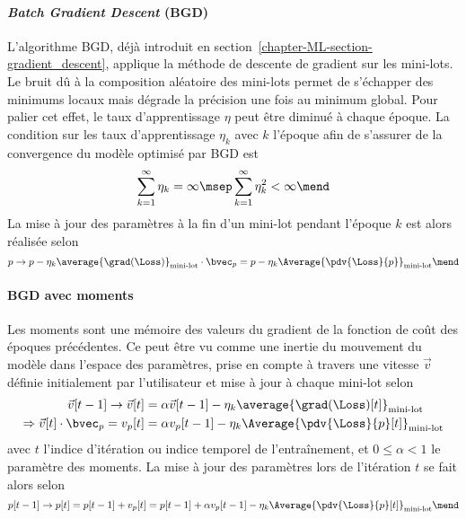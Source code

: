 \paragraph{\emph{Batch Gradient Descent} (BGD)} \cite{SGD}
L'algorithme BGD,
déjà introduit en section~\ref{chapter-ML-section-gradient_descent},
applique la méthode de descente de gradient
sur les mini-lots.
Le bruit dû à la composition aléatoire des mini-lots
permet de s'échapper des minimums locaux
mais dégrade la précision une fois au minimum global.
Pour palier cet effet, le taux d'apprentissage $\eta$ peut être diminué à chaque époque.
La condition sur les taux d'apprentissage $\eta_k$ avec $k$ l'époque afin de s'assurer de la convergence du modèle optimisé par BGD est~\cite{DNN}
\begin{equation}
\sum_{k=1}^\infty \eta_k = \infty
\msep
\sum_{k=1}^\infty \eta_k^2 < \infty
\mend
\end{equation}
La mise à jour des paramètres à la fin d'un mini-lot pendant l'époque $k$ est alors réalisée selon
\begin{equation}
p \to p - \eta_k \average{\grad(\Loss)}_\text{mini-lot} \cdot \bvec_p = p - \eta_k \Average{\pdv{\Loss}{p}}_\text{mini-lot}
\mend
\end{equation}
\paragraph{BGD avec moments} \cite{DNN}
Les moments sont une \og mémoire \fg{} des valeurs du gradient de la fonction de coût des époques précédentes.
Ce peut être vu comme une inertie du mouvement du modèle dans l'espace des paramètres,
prise en compte à travers une vitesse $\vec{v}$ définie initialement par l'utilisateur et mise à jour à chaque mini-lot selon
\begin{align}
\vec{v}[t-1] \to \vec{v}[t]
&=
\alpha\vec{v}[t-1] - \eta_k \average{\grad(\Loss)[t]}_\text{mini-lot}
\\
\Rightarrow
\vec{v}[t]\cdot\bvec_p = v_p[t]
&=
\alpha v_p[t-1] - \eta_k \Average{\pdv{\Loss}{p} [t]}_\text{mini-lot}
\end{align}
avec
$t$ l'indice d'itération ou indice temporel de l'entraînement,
et
$0\leq\alpha<1$ le paramètre des moments.
La mise à jour des paramètres lors de l'itération $t$ se fait alors selon
\begin{equation}
p [t-1] \to p[t]
=
p[t-1] + v_p[t]
=
p[t-1] + \alpha v_p[t-1] - \eta_k \Average{\pdv{\Loss}{p} [t]}_\text{mini-lot}
\mend
\end{equation}
